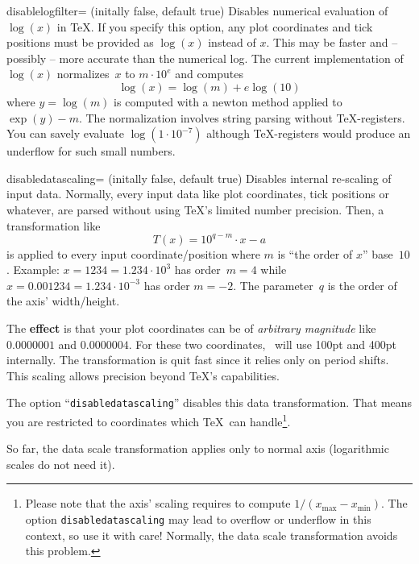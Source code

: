 \begin{pgfplotskey}{disablelogfilter= (initally false, default true)}
Disables numerical evaluation of $\log(x)$ in \TeX. If you specify this option, any plot coordinates and tick positions must be provided as $\log(x)$ instead of $x$. This may be faster and -- possibly -- more accurate than the numerical log. The current implementation of $\log(x)$ normalizes~$x$ to $m\cdot 10^e$ and computes
\[ \log(x) = \log(m) + e \log(10) \]
where $y = \log(m)$ is computed with a newton method applied to $\exp(y) - m$. The normalization involves string parsing without \TeX-registers. You can savely evaluate $\log(1\cdot 10^{-7})$ although \TeX-registers would produce an underflow for such small numbers. 
\end{pgfplotskey}

\label{sec:disabledatascaling}%
\begin{pgfplotskey}{disabledatascaling= (initally false, default true)}
Disables internal re-scaling of input data. Normally, every input data like plot coordinates, tick positions or whatever, are parsed without using \TeX's limited number precision. Then, a transformation like 
	\[ T(x) = 10^{q-m} \cdot x - a \]
is applied to every input coordinate/position where $m$ is ``the order of $x$'' base~$10$. Example: $x=1234 = 1.234\cdot 10^3$ has order~$m=4$ while $x=0.001234 = 1.234\cdot 10^{-3}$ has order $m=-2$. The parameter~$q$ is the order of the axis' width/height.

The \textbf{effect} is that your plot coordinates can be of \emph{arbitrary magnitude} like $0.0000001$ and $0.0000004$. For these two coordinates, \PGFPlots\ will use 100pt and 400pt internally. The transformation is quit fast since it relies only on period shifts. This scaling allows precision beyond \TeX's capabilities.

The option ``\texttt{disabledatascaling}'' disables this data transformation. That means you are restricted to coordinates which \TeX\ can handle\footnote{Please note that the axis' scaling requires to compute $1/( x_\text{max} - x_{\text{min}} )$. The option \texttt{disabledatascaling} may lead to overflow or underflow in this context, so use it with care! Normally, the data scale transformation avoids this problem.}.

So far, the data scale transformation applies only to normal axis (logarithmic scales do not need it). 
\end{pgfplotskey}


